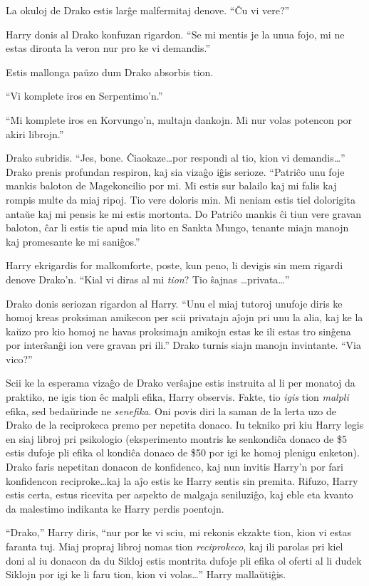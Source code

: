 La okuloj de Drako estis larĝe malfermitaj denove. ``Ĉu vi vere?''

Harry donis al Drako konfuzan rigardon. ``Se mi mentis je la unua
fojo, mi ne estas dironta la veron nur pro ke vi demandis.''

Estis mallonga paŭzo dum Drako absorbis tion.

``Vi komplete iros en Serpentimo'n.''

``Mi komplete iros en Korvungo'n, multajn dankojn. Mi nur volas
potencon por akiri librojn.''

Drako subridis. ``Jes, bone. Ĉiaokaze\ldots por respondi al tio, kion
vi demandis\ldots'' Drako prenis profundan respiron, kaj sia vizaĝo
iĝis serioze. ``Patriĉo unu foje mankis baloton de Magekoncilio por
mi. Mi estis sur balailo kaj mi falis kaj rompis multe da miaj
ripoj. Tio vere doloris min. Mi neniam estis tiel dolorigita antaŭe kaj
mi pensis ke mi estis mortonta. Do Patriĉo mankis ĉi tiun vere gravan
baloton, ĉar li estis tie apud mia lito en Sankta Mungo, tenante miajn
manojn kaj promesante ke mi saniĝos.''

Harry ekrigardis for malkomforte, poste, kun peno, li devigis sin mem
rigardi denove Drako'n. ``Kial vi diras al mi \emph{tion}? Tio ŝajnas
\ldots privata\ldots''

Drako donis seriozan rigardon al Harry. ``Unu el miaj tutoroj unufoje
diris ke homoj kreas proksiman amikecon per scii privatajn aĵojn pri
unu la alia, kaj ke la kaŭzo pro kio homoj ne havas proksimajn amikojn
estas ke ili estas tro sinĝena por interŝanĝi ion vere gravan pri
ili.'' Drako turnis siajn manojn invintante. ``Via vico?''

Scii ke la esperama vizaĝo de Drako verŝajne estis instruita al li per
monatoj da praktiko, ne igis tion êc malpli efika, Harry
observis. Fakte, tio \emph{igis} tion \emph{malpli} efika, sed
bedaŭrinde ne \emph{senefika}. Oni povis diri la saman de la lerta uzo
de Drako de la reciprokeca premo per nepetita donaco. Iu tekniko pri kiu
Harry legis en siaj libroj pri psikologio (eksperimento montris ke
senkondiĉa donaco de \$5 estis dufoje pli efika ol kondiĉa donaco de
\$50 por igi ke homoj plenigu enketon). Drako faris nepetitan donacon
de konfidenco, kaj nun invitis Harry'n por fari konfidencon
reciproke\ldots kaj la aĵo estis ke Harry sentis sin premita. Rifuzo,
Harry estis certa, estus ricevita per aspekto de malgaja seniluziĝo,
kaj eble eta kvanto da malestimo indikanta ke Harry perdis poentojn.

``Drako,'' Harry diris, ``nur por ke vi sciu, mi rekonis ekzakte
tion, kion vi estas faranta tuj. Miaj propraj libroj nomas tion
\emph{reciprokeco}, kaj ili parolas pri kiel doni al iu donacon da du
Sikloj estis montrita dufoje pli efika ol oferti al li dudek Siklojn
por igi ke li faru tion, kion vi volas\ldots''  Harry mallaŭtiĝis.

